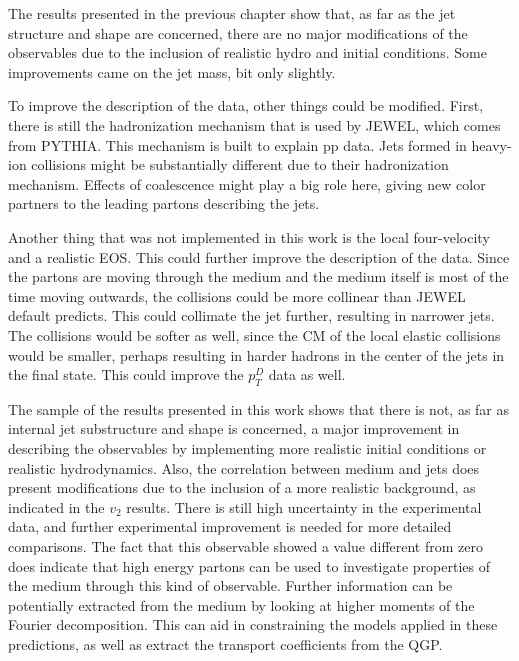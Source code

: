 The results presented in the previous chapter show that, as far as the jet structure and shape are concerned, there are no major modifications of the observables due to the inclusion of realistic hydro and initial conditions. Some improvements came on the jet mass, bit only slightly.
\par
To improve the description of the data, other things could be modified. First, there is still the hadronization mechanism that is used by JEWEL, which comes from PYTHIA. This mechanism is built to explain pp data. Jets formed in heavy-ion collisions might be substantially different due to their hadronization mechanism. Effects of coalescence might play a big role here, giving new color partners to the leading partons describing the jets.
\par
Another thing that was not implemented in this work is the local four-velocity and a realistic EOS. This could further improve the description of the data. Since the partons are moving through the medium and the medium itself is most of the time moving outwards, the collisions could be more collinear than JEWEL default predicts. This could collimate the jet further, resulting in narrower jets. The collisions would be softer as well, since the CM of the local elastic collisions would be smaller, perhaps resulting in harder hadrons in the center of the jets in the final state. This could improve the $p_T^D$ data as well.
\par
The sample of the results presented in this work shows that there is not, as far as internal jet substructure and shape is concerned, a major improvement in describing the observables by implementing more realistic initial conditions or realistic hydrodynamics. Also, the correlation between medium and jets does present modifications due to the inclusion of a more realistic background, as indicated in the $v_2$ results. There is still high uncertainty in the experimental data, and further experimental improvement is needed for more detailed comparisons. The fact that this observable showed a value different from zero does indicate that high energy partons can be used to investigate properties of the medium through this kind of observable. Further information can be potentially extracted from the medium by looking at higher moments of the Fourier decomposition. This can aid in constraining the models applied in these predictions, as well as extract the transport coefficients from the QGP.
